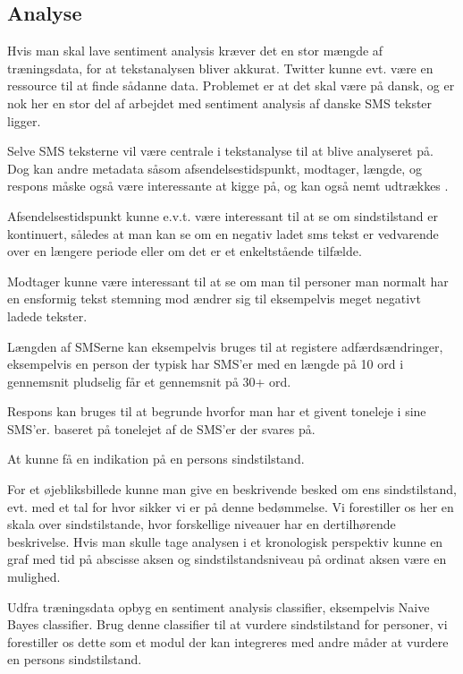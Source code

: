 \subsection{Analyse}
	\begin{description}[style=nextline]
		\item[Har vi data nok?]
		Hvis man skal lave sentiment analysis kræver det en stor mængde af træningsdata, for at tekstanalysen bliver akkurat. Twitter kunne evt. være en ressource til at finde sådanne data. Problemet er at det skal være på dansk, og er nok her en stor del af arbejdet med sentiment analysis af danske SMS tekster ligger.
		\item[Hvilke data skal benyttes?]
		Selve SMS teksterne vil være centrale i tekstanalyse til at blive analyseret på.
		Dog kan andre metadata såsom afsendelsestidspunkt, modtager, længde, og respons måske også være interessante at kigge på, og kan også nemt udtrækkes \citep{misc:androidsmsread}.
		
		Afsendelsestidspunkt kunne e.v.t. være interessant til at se om sindstilstand er kontinuert, således at man kan se om en negativ ladet sms tekst er vedvarende over en længere periode eller om det er et enkeltstående tilfælde.
		
		Modtager kunne være interessant til at se om man til personer man normalt har en ensformig tekst stemning mod ændrer sig til eksempelvis meget negativt ladede tekster.
		
		Længden af SMSerne kan eksempelvis bruges til at registere adfærdsændringer, eksempelvis en person der typisk har SMS'er med en længde på 10 ord i gennemsnit pludselig får et gennemsnit på 30+ ord.
		
		Respons kan bruges til at begrunde hvorfor man har et givent toneleje i sine SMS'er. baseret på tonelejet af de SMS'er der svares på.
		\item[Formål med analysen]
		At kunne få en indikation på en persons sindstilstand.
		\item[Idé til visualisering]
		For et øjebliksbillede kunne man give en beskrivende besked om ens sindstilstand, evt. med et tal for hvor sikker vi er på denne bedømmelse.
		Vi forestiller os her en skala over sindstilstande, hvor forskellige niveauer har en dertilhørende beskrivelse.
		Hvis man skulle tage analysen i et kronologisk perspektiv kunne en graf med tid på abscisse aksen og sindstilstandsniveau på ordinat aksen være en mulighed.
		\item[Oprids a fremgangsmåde]
		Udfra træningsdata opbyg en sentiment analysis classifier, eksempelvis Naive Bayes classifier.
		Brug denne classifier til at vurdere sindstilstand for personer, vi forestiller os dette som et modul der kan integreres med andre måder at vurdere en persons sindstilstand.
	\end{description}